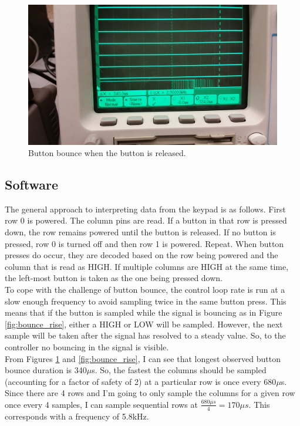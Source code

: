 \documentclass[11pt]{article}
\begin{document}
\begin{figure}[h!]
\centering
\includegraphics[scale=0.11]{bounce_fall.jpg}
\caption{Button bounce when the button is released.}
\label{fig:bounce_fall}
\end{figure} 



\subsection{Software}

The general approach to interpreting data from the keypad is as follows. First row 0 is powered. The column pins are read. If a button in that row is pressed down, the row remains powered until the button is released. If no button is pressed, row 0 is turned off and then row 1 is powered. Repeat. When button presses do occur, they are decoded based on the row being powered and the column that is read as HIGH. If multiple columns are HIGH at the same time, the left-most button is taken as the one being pressed down. \\

To cope with the challenge of button bounce, the control loop rate is run at a slow enough frequency to avoid sampling twice in the same button press. This means that if the button is sampled while the signal is bouncing as in Figure \ref{fig:bounce_rise}, either a HIGH or LOW will be sampled. However, the next sample will be taken after the signal has resolved to a steady value. So, to the controller no bouncing in the signal is visible. \\

From Figures \ref{fig:bounce_fall} and \ref{fig:bounce_rise}, I can see that longest observed button bounce duration is 340$\mu$s. So, the fastest the columns should be sampled (accounting for a factor of safety of 2) at a particular row is once every 680$\mu$s. Since there are 4 rows and I'm going to only sample the columns for a given row once every 4 samples, I can sample sequential rows at $\frac{680\mu s}{4}=170\mu s$. This corresponds with a frequency of 5.8kHz.
\end{document}
